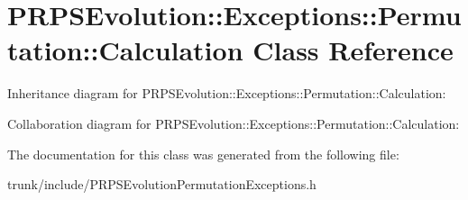 \hypertarget{class_p_r_p_s_evolution_1_1_exceptions_1_1_permutation_1_1_calculation}{\section{P\-R\-P\-S\-Evolution\-:\-:Exceptions\-:\-:Permutation\-:\-:Calculation Class Reference}
\label{class_p_r_p_s_evolution_1_1_exceptions_1_1_permutation_1_1_calculation}
}


Inheritance diagram for P\-R\-P\-S\-Evolution\-:\-:Exceptions\-:\-:Permutation\-:\-:Calculation\-:


Collaboration diagram for P\-R\-P\-S\-Evolution\-:\-:Exceptions\-:\-:Permutation\-:\-:Calculation\-:


The documentation for this class was generated from the following file\-:\begin{DoxyCompactItemize}
\item 
trunk/include/P\-R\-P\-S\-Evolution\-Permutation\-Exceptions.\-h\end{DoxyCompactItemize}

